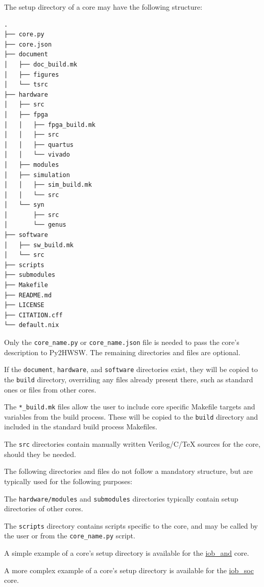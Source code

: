 %

The setup directory of a core may have the following structure:

\begin{verbatim}
.
├── core.py
├── core.json
├── document
│   ├── doc_build.mk
│   ├── figures
│   └── tsrc
├── hardware
│   ├── src
│   ├── fpga
│   │   ├── fpga_build.mk
│   │   ├── src
│   │   ├── quartus
│   │   └── vivado
│   ├── modules
│   ├── simulation
│   │   ├── sim_build.mk
│   │   └── src
│   └── syn
│       ├── src
│       └── genus
├── software
│   ├── sw_build.mk
│   └── src
├── scripts
├── submodules
├── Makefile
├── README.md
├── LICENSE
├── CITATION.cff
└── default.nix
\end{verbatim}

Only the \texttt{core\_name.py} or \texttt{core\_name.json} file is needed to
pass the core's description to Py2HWSW.  The remaining directories and files are
optional.

If the \texttt{document}, \texttt{hardware}, and \texttt{software} directories
exist, they will be copied to the \texttt{build} directory, overriding any files
already present there, such as standard ones or files from other cores.

The \texttt{*\_build.mk} files allow the user to include core specific Makefile
targets and variables from the build process.  These will be copied to the
\texttt{build} directory and included in the standard build process Makefiles.

The \texttt{src} directories contain manually written Verilog/C/TeX sources for
the core, should they be needed.

The following directories and files do not follow a mandatory structure, but are
typically used for the following purposes:

The \texttt{hardware/modules} and \texttt{submodules} directories typically
contain setup directories of other cores.

The \texttt{scripts} directory contains scripts specific to the core, and may be
called by the user or from the \texttt{core\_name.py} script.

A simple example of a core's setup directory is available for the
\href{https://github.com/IObundle/py2hwsw/tree/main/py2hwsw/lib/hardware/basic_tests/iob_and}{iob\_and}
core.

A more complex example of a core's setup directory is available for the
\href{https://github.com/IObundle/iob-soc}{iob\_soc} core.
